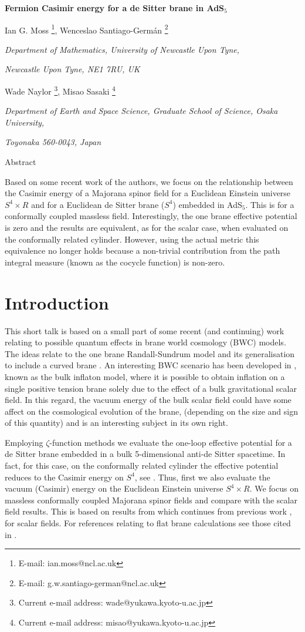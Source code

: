 \documentclass[a4paper,a4paper]{article}
\def\abstract#1{\vskip 7mm 
        \begin{center}{\large Abstract}\par \smallskip
                \begin{minipage}[c]{12cm}
                        \small #1
                \end{minipage}
        \end{center}
}
\def\title#1{\begin{center}{\Large\bf #1}\end{center}}
\def\author#1{\vskip 5mm \begin{center}{#1}\end{center}}
\def\address#1{\begin{center}{\it #1}\end{center}}
\begin{document}
\title{%
Fermion Casimir energy for a de Sitter brane in AdS$_5$}
\author{%
Ian G. Moss \footnote{E-mail: ian.moss@ncl.ac.uk}, 
Wenceslao Santiago-Germ\'{a}n \footnote{E-mail: g.w.santiago-german@ncl.ac.uk}
}
\address{%
  \centerline{\em Department of Mathematics, University of  
Newcastle Upon Tyne,} 
\centerline{\em  Newcastle Upon Tyne, NE1 7RU, UK}
}
\author{%
Wade Naylor \footnote{ Current e-mail address: wade@yukawa.kyoto-u.ac.jp}, 
Misao Sasaki \footnote{Current e-mail address: misao@yukawa.kyoto-u.ac.jp}
}
\address{%
\centerline{\em Department of Earth and Space Science, Graduate 
School of Science, Osaka University,} 
\centerline{\em  Toyonaka 560-0043, Japan} 
}
\abstract{
Based on some recent work of the authors, we focus on the 
relationship between the Casimir energy of a Majorana spinor field for a Euclidean 
Einstein universe $S^4\times R$ and for a Euclidean de Sitter brane ($S^4$) 
embedded in AdS$_5$. 
This is for a conformally coupled massless field. 
Interestingly, the one brane effective potential is zero and the results are 
equivalent, as for the scalar case, when evaluated on the conformally related cylinder. 
However, using the actual metric this equivalence no longer holds because a non-trivial 
contribution from the path integral measure (known as the cocycle function) is non-zero.
}
\section{Introduction}

This short talk is based on a small part of some recent (and continuing) work 
\cite{NOZ,NS,ENOO,MNSS} relating to possible quantum effects in brane world 
cosmology (BWC) models.
The ideas relate to the one brane Randall-Sundrum model \cite{RS2} and its 
generalisation to include a curved brane \cite{SMS,GT}.
 An interesting BWC scenario has been developed in \cite{KKS, HIME}, 
known as the bulk inflaton model, where it is possible to obtain
inflation on a single positive tension brane solely due
 to the effect of a  bulk gravitational scalar field. 
In this regard, the vacuum energy of the bulk scalar field
could have some affect on the cosmological evolution of the
brane, (depending on the size and sign of this quantity) and
is an interesting subject in its own right. 

Employing $\zeta$-function methods we evaluate the one-loop effective 
potential for a de Sitter brane embedded in a bulk 5-dimensional
anti-de Sitter spacetime. In fact, for this case, on the conformally related cylinder the 
effective potential reduces to the Casimir energy on $S^4$, see \cite{NOZ}. 
Thus, first we also evaluate the vacuum (Casimir) energy on the 
Euclidean Einstein universe $S^4\times R$. We focus on massless 
conformally coupled Majorana spinor fields and compare with the scalar field 
results. 
This is based on results from \cite{MNSS} which continues from
previous work \cite{NS}, for scalar fields. For references relating to flat brane 
calculations see those cited in \cite{NS}. 
\end{document}
